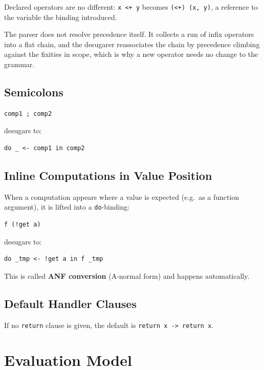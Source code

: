 \documentclass[11pt,a4paper]{article}
\newcommand{\cba}[1]{\lstinline[style=cbainline]{#1}}
\begin{document}
Declared operators are no different: \texttt{x <+ y} becomes
\texttt{(<+) (x, y)}, a reference to the variable the binding introduced.

The parser does not resolve precedence itself.  It collects a run of infix
operators into a flat chain, and the desugarer reassociates the chain by
precedence climbing against the fixities in scope, which is why a new
operator needs no change to the grammar.

\subsection{Semicolons}

\begin{lstlisting}
comp1 ; comp2
\end{lstlisting}

desugars to:

\begin{lstlisting}
do _ <- comp1 in comp2
\end{lstlisting}

\subsection{Inline Computations in Value Position}

When a computation appears where a value is expected (e.g.\ as a function
argument), it is lifted into a \cba{do}-binding:

\begin{lstlisting}
f (!get a)
\end{lstlisting}

desugars to:

\begin{lstlisting}
do _tmp <- !get a in f _tmp
\end{lstlisting}

This is called \textbf{ANF conversion} (A-normal form) and happens
automatically.

\subsection{Default Handler Clauses}

If no \cba{return} clause is given, the default is
\cba{return x -> return x}.

\section{Evaluation Model}
\label{sec:eval}
\end{document}
